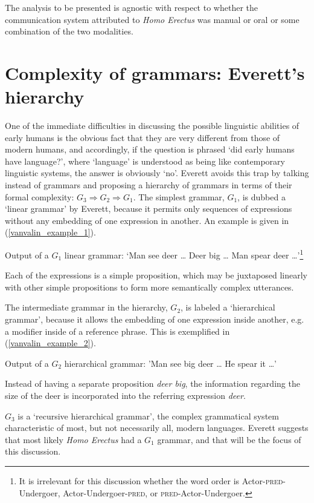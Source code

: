 \documentclass[output=paper,colorlinks,citecolor=brown]{langscibook}
\begin{document}
The analysis to be presented is agnostic with respect to whether the communication system attributed to \emph{Homo Erectus} was manual or oral or some combination of the two modalities.

\section{Complexity of grammars: Everett’s hierarchy}\label{sec:vanvalin:2}
One of the immediate difficulties in discussing the possible linguistic abilities of early humans is the obvious fact that they are very different from those of modern humans, and accordingly, if the question is phrased ‘did early humans have language?’, where ‘language’ is understood as being like contemporary linguistic systems, the answer is obviously ‘no’.  Everett avoids this trap by talking instead of grammars and proposing a hierarchy of grammars in terms of their formal complexity: $G_3 \Rightarrow G_2 \Rightarrow G_1$.  The simplest grammar, $G_1$, is dubbed a ‘linear grammar’ by Everett, because it permits only sequences of expressions without any embedding of one expression in another. An example is given in (\ref{vanvalin_example_1}).

\ea \label{vanvalin_example_1}
Output of a $G_1$ linear grammar: ‘Man see deer \ldots{}  Deer big \ldots{}  Man spear deer \ldots ’\footnote{It is irrelevant for this discussion whether the word order is Actor-\textsc{pred}-Undergoer, Actor-Undergoer-\textsc{pred}, or \textsc{pred}-Actor-Undergoer.}
\z

Each of the expressions is a simple proposition, which may be juxtaposed linearly with other simple propositions to form more semantically complex utterances.

The intermediate grammar in the hierarchy, $G_2$, is labeled a ‘hierarchical grammar’, because it allows the embedding of one expression inside another, e.g. a modifier inside of a reference phrase.  This is exemplified in (\ref{vanvalin_example_2}).

\ea \label{vanvalin_example_2}
Output of a $G_2$ hierarchical grammar: 'Man see big deer \ldots{}  He spear it \ldots ’
\z

Instead of having a separate proposition \emph{deer big}, the information regarding the size of the deer is incorporated into the referring expression \emph{deer}.

$G_3$ is a ‘recursive hierarchical grammar’, the complex grammatical system characteristic of most, but not necessarily all, modern languages.  Everett suggests that most likely \emph{Homo Erectus} had a $G_1$ grammar, and that will be the focus of this discussion.
\end{document}
